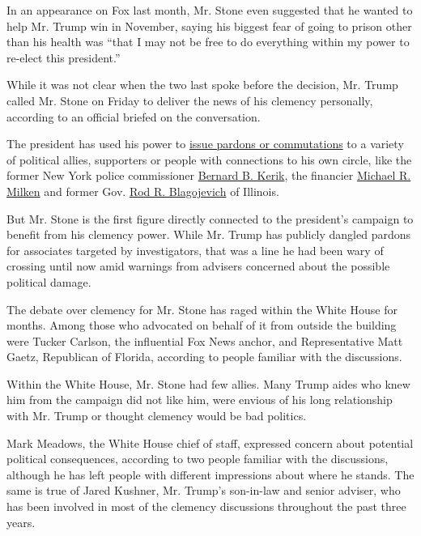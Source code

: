 In an appearance on Fox last month, Mr. Stone even suggested that he
wanted to help Mr. Trump win in November, saying his biggest fear of
going to prison other than his health was ``that I may not be free to do
everything within my power to re-elect this president.''

While it was not clear when the two last spoke before the decision, Mr.
Trump called Mr. Stone on Friday to deliver the news of his clemency
personally, according to an official briefed on the conversation.

The president has used his power to
\href{https://www.nytimes.com/2020/02/18/us/politics/trump-pardon-blagojevich-debartolo.html}{issue
pardons or commutations} to a variety of political allies, supporters or
people with connections to his own circle, like the former New York
police commissioner
\href{https://www.nytimes.com/2020/02/19/us/politics/trump-pardons.html}{Bernard
B. Kerik}, the financier
\href{https://www.nytimes.com/2020/02/18/business/michael-milken-case-lessons.html}{Michael
R. Milken} and former Gov.
\href{https://www.nytimes.com/2020/02/19/us/rod-blagojevich-chicago.html}{Rod
R. Blagojevich} of Illinois.

But Mr. Stone is the first figure directly connected to the president's
campaign to benefit from his clemency power. While Mr. Trump has
publicly dangled pardons for associates targeted by investigators, that
was a line he had been wary of crossing until now amid warnings from
advisers concerned about the possible political damage.

The debate over clemency for Mr. Stone has raged within the White House
for months. Among those who advocated on behalf of it from outside the
building were Tucker Carlson, the influential Fox News anchor, and
Representative Matt Gaetz, Republican of Florida, according to people
familiar with the discussions.

Within the White House, Mr. Stone had few allies. Many Trump aides who
knew him from the campaign did not like him, were envious of his long
relationship with Mr. Trump or thought clemency would be bad politics.

Mark Meadows, the White House chief of staff, expressed concern about
potential political consequences, according to two people familiar with
the discussions, although he has left people with different impressions
about where he stands. The same is true of Jared Kushner, Mr. Trump's
son-in-law and senior adviser, who has been involved in most of the
clemency discussions throughout the past three years.

